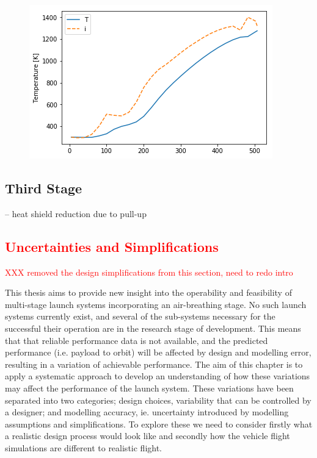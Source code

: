 \begin{figure}[!ht]
\centering
\includegraphics[width=0.7\linewidth]{figures/A1_uncertainty-analysis/TPos1-ActiveCooling}
\caption{}
\label{fig:TPos1-ActiveCooling}
\end{figure}


\section{Third Stage}

-- heat shield reduction due to pull-up

\textcolor{red}{
\chapter{Uncertainties and Simplifications}
}
\textcolor{red}{XXX removed the design simplifications from this section, need to redo intro}



This thesis aims to provide new insight into the operability and feasibility of multi-stage launch systems incorporating an air-breathing stage.
No such launch systems currently exist, and several of the sub-systems necessary for the successful their operation are in the research stage of development.
This means that that reliable performance data is not available, and the predicted performance (i.e. payload to orbit) will be affected by design and modelling error, resulting in a variation of achievable performance. 
The aim of this chapter is to apply a systematic approach to develop an understanding of how these variations may affect the performance of the launch system. These variations have been separated into two categories; design choices, variability that can be controlled by a designer; and modelling accuracy, ie. uncertainty introduced by modelling assumptions and simplifications. To explore these we need to consider firstly what a realistic design process would look like and secondly how the vehicle flight simulations are different to realistic flight. 



